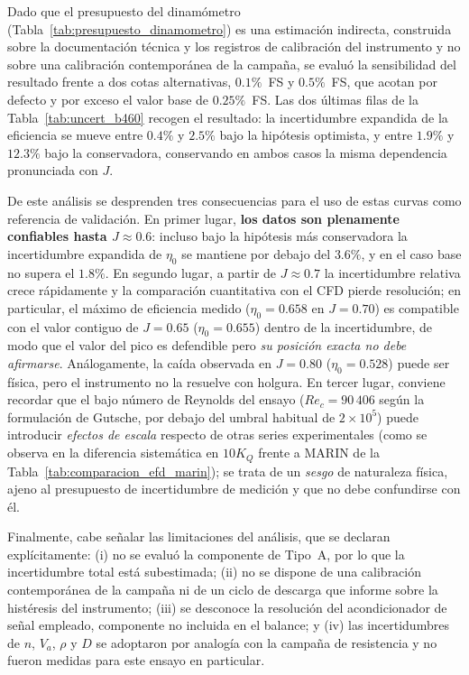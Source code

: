 Dado que el presupuesto del dinamómetro (Tabla~\ref{tab:presupuesto_dinamometro}) es una estimación indirecta, construida sobre la documentación técnica y los registros de calibración del instrumento y no sobre una calibración contemporánea de la campaña, se evaluó la sensibilidad del resultado frente a dos cotas alternativas, $0.1\%$~FS y $0.5\%$~FS, que acotan por defecto y por exceso el valor base de $0.25\%$~FS. Las dos últimas filas de la Tabla~\ref{tab:uncert_b460} recogen el resultado: la incertidumbre expandida de la eficiencia se mueve entre $0.4\%$ y $2.5\%$ bajo la hipótesis optimista, y entre $1.9\%$ y $12.3\%$ bajo la conservadora, conservando en ambos casos la misma dependencia pronunciada con $J$.


De este análisis se desprenden tres consecuencias para el uso de estas curvas como referencia de validación. En primer lugar, \textbf{los datos son plenamente confiables hasta $J \approx 0.6$}: incluso bajo la hipótesis más conservadora la incertidumbre expandida de $\eta_0$ se mantiene por debajo del $3.6\%$, y en el caso base no supera el $1.8\%$. En segundo lugar, a partir de $J \approx 0.7$ la incertidumbre relativa crece rápidamente y la comparación cuantitativa con el CFD pierde resolución; en particular, el máximo de eficiencia medido ($\eta_0 = 0.658$ en $J = 0.70$) es compatible con el valor contiguo de $J = 0.65$ ($\eta_0 = 0.655$) dentro de la incertidumbre, de modo que el valor del pico es defendible pero \emph{su posición exacta no debe afirmarse}. Análogamente, la caída observada en $J = 0.80$ ($\eta_0 = 0.528$) puede ser física, pero el instrumento no la resuelve con holgura. En tercer lugar, conviene recordar que el bajo número de Reynolds del ensayo ($Re_c = 90\,406$ según la formulación de Gutsche, por debajo del umbral habitual de $2\times10^5$) puede introducir \emph{efectos de escala} respecto de otras series experimentales (como se observa en la diferencia sistemática en $10K_Q$ frente a MARIN de la Tabla~\ref{tab:comparacion_efd_marin}); se trata de un \emph{sesgo} de naturaleza física, ajeno al presupuesto de incertidumbre de medición y que no debe confundirse con él.

Finalmente, cabe señalar las limitaciones del análisis, que se declaran explícitamente: (i) no se evaluó la componente de Tipo~A, por lo que la incertidumbre total está subestimada; (ii) no se dispone de una calibración contemporánea de la campaña ni de un ciclo de descarga que informe sobre la histéresis del instrumento; (iii) se desconoce la resolución del acondicionador de señal empleado, componente no incluida en el balance; y (iv) las incertidumbres de $n$, $V_a$, $\rho$ y $D$ se adoptaron por analogía con la campaña de resistencia y no fueron medidas para este ensayo en particular. 

